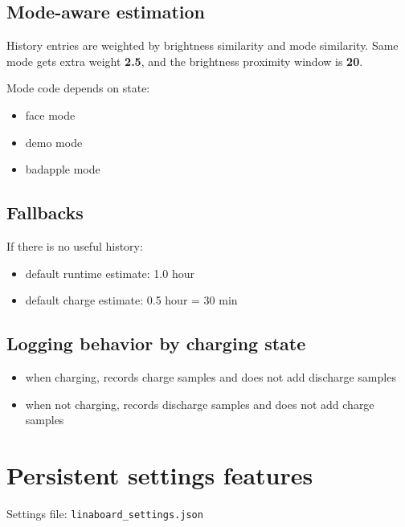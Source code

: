 \documentclass[11pt]{article}
\begin{document}
\subsection{Mode-aware estimation}
History entries are weighted by brightness similarity and mode similarity. Same mode gets extra weight \textbf{2.5}, and the brightness proximity window is \textbf{20}.

Mode code depends on state:
\begin{itemize}
  \item face mode
  \item demo mode
  \item badapple mode
\end{itemize}

\subsection{Fallbacks}
If there is no useful history:
\begin{itemize}
  \item default runtime estimate: 1.0 hour
  \item default charge estimate: 0.5 hour = 30 min
\end{itemize}

\subsection{Logging behavior by charging state}
\begin{itemize}
  \item when charging, records charge samples and does not add discharge samples
  \item when not charging, records discharge samples and does not add charge samples
\end{itemize}

\section{Persistent settings features}
Settings file: \texttt{linaboard\_settings.json}
\end{document}
